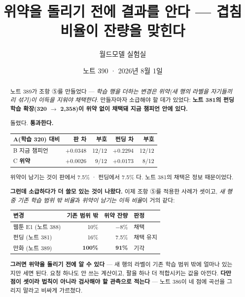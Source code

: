 \documentclass[11pt]{article}
\begin{document}
\title{위약을 돌리기 전에 결과를 안다 --- 겹침 비율이 잔량을 맞힌다}
\author{월드모델 실험실}
\date{노트 390 · 2026년 8월 1일}
\maketitle

\begin{abstract}
노트 389가 조항 ⑤를 만들었다 --- \emph{학습 행을 더하는 변경은 위약(새 행의
라벨을 자기들끼리 섞기)이 이득을 지워야 채택한다.} 만들자마자 소급해야 할
데가 있었다: \textbf{노트 381의 펀딩 학습 확장(320 $\to$ 2,358)이 위약 없이
채택돼 지금 챔피언 안에 있다.}

돌렸다. \textbf{통과한다.}

\begin{center}
\begin{tabular}{lrrrr}
\hline
A(학습 320) 대비 & 판 차 & 부호 & 펀딩 차 & 부호 \\
\hline
B 지금 챔피언 & $+0.0348$ & 12/12 & $+0.2294$ & 12/12 \\
C \textbf{위약} & $+0.0026$ & 9/12 & $\mathbf{+0.0173}$ & 8/12 \\
\hline
\end{tabular}
\end{center}

위약이 남기는 것이 판에서 7.5\% · 펀딩에서 7.5\% 다. 노트 381의 채택은
정보 때문이었다.

\textbf{그런데 소급하다가 더 쓸모 있는 것이 나왔다.} 이제 조항 ⑤를 적용한
사례가 셋이고, \emph{새 행 중 기존 학습 범위 밖 비율}과 \emph{위약이 남기는
이득 비율}이 거의 같다:

\begin{center}
\begin{tabular}{lrrl}
\hline
변경 & 기존 범위 밖 & 위약 잔량 & 판정 \\
\hline
웹툰 E1 (노트 388) & 10\% & $-8$\% & 채택 \\
펀딩 (노트 381) & 16\% & 7.5\% & 채택 유지 \\
만화 (노트 389) & \textbf{100\%} & \textbf{91\%} & 기각 \\
\hline
\end{tabular}
\end{center}

\textbf{그러면 위약을 돌리기 전에 알 수 있다} --- 새 행의 라벨이 기존 학습
범위 밖에 얼마나 있는지만 세면 된다. 요청 하나도 안 쓰는 계산이고, 팔을
하나 더 적합시키는 값을 아낀다. \textbf{다만 점이 셋이라 법칙이 아니라
검사해야 할 관측으로 적는다} --- 노트 386이 네 점에 곡선을 그리지 말라고
비싸게 가르쳤다.
\end{abstract}
\end{document}
